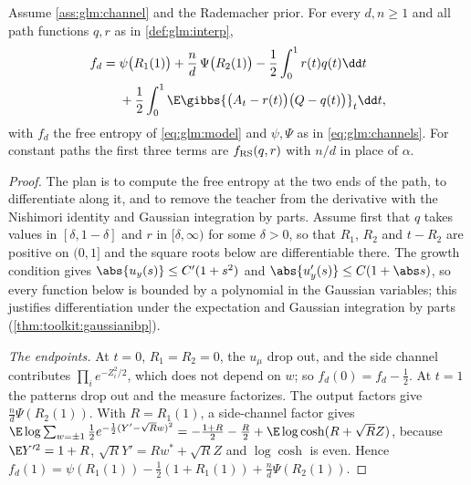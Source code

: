 \begin{refsection}
\begin{theorem}\label{thm:glm:sumrule}
Assume \cref{ass:glm:channel} and the Rademacher prior. For every $d,n\ge1$ and all path functions $q,r$ as in \cref{def:glm:interp},
\begin{equation}\label{eq:glm:sumrule}
\begin{split}
f_d={}&\psi\bigl(R_1(1)\bigr)+\frac nd\,\Psi\bigl(R_2(1)\bigr)-\frac12\int_0^1r(t)q(t)\dd t\\
&+\frac12\int_0^1\E\gibbs{\bigl(A_t-r(t)\bigr)\bigl(Q-q(t)\bigr)}_t\dd t,
\end{split}
\end{equation}
with $f_d$ the free entropy of \eqref{eq:glm:model} and $\psi,\Psi$ as in \eqref{eq:glm:channels}. For constant paths the first three terms are $f_{\mathrm{RS}}(q,r)$ with $n/d$ in place of $\alpha$.
\end{theorem}

\begin{proof}
The plan is to compute the free entropy at the two ends of the path, to differentiate along it, and to remove the teacher from the derivative with the Nishimori identity and Gaussian integration by parts. Assume first that $q$ takes values in $[\delta,1-\delta]$ and $r$ in $[\delta,\infty)$ for some $\delta>0$, so that $R_1$, $R_2$ and $t-R_2$ are positive on $(0,1]$ and the square roots below are differentiable there. The growth condition gives $\abs{u_y(s)}\le C'(1+s^2)$ and $\abs{u'_y(s)}\le C(1+\abs s)$, so every function below is bounded by a polynomial in the Gaussian variables; this justifies differentiation under the expectation and Gaussian integration by parts (\cref{thm:toolkit:gaussianibp}).

\emph{The endpoints.} At $t=0$, $R_1=R_2=0$, the $u_\mu$ drop out, and the side channel contributes $\prod_ie^{-Z_i^2/2}$, which does not depend on $w$; so $f_d(0)=f_d-\frac12$. At $t=1$ the patterns drop out and the measure factorizes. The output factors give $\frac nd\Psi(R_2(1))$. With $R=R_1(1)$, a side-channel factor gives $\E\log\sum_{w=\pm1}\frac12e^{-\frac12(Y'-\sqrt Rw)^2}=-\frac{1+R}2-\frac R2+\E\log\cosh(R+\sqrt RZ)$, because $\E Y'^2=1+R$, $\sqrt RY'=Rw^*+\sqrt RZ$ and $\log\cosh$ is even. Hence $f_d(1)=\psi(R_1(1))-\frac12(1+R_1(1))+\frac nd\Psi(R_2(1))$.


\end{proof}
\end{refsection}
